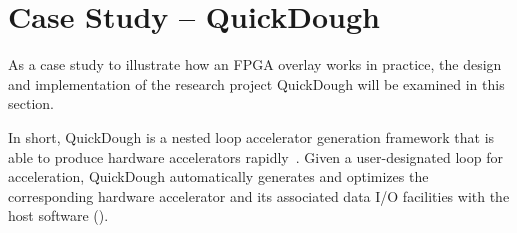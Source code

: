 \iffalse
\subsection{Other Related Works}
It is worth noting that the concept of FPGA overlay has been evolved out of many related earlier works in related areas.  Some of them are listed below.

To address the lengthy tool run time, researchers and tool vendors have been exploring the use of macro-based techniques for a while.  In the work of HMFlow \cite{lavin2010, lavin2011}, Lavin et al. explored the tradeoffs between implementation flexibility and compilation by incorporating hard macros into the design flow.  In the same work, they also 

On top of the various overlay architectures, there are techniques that are complementary to the FPGA
overlays. First of all, Macros based compilation techniques \cite{lavin2010, lavin2011} help to
improve both design portability and improve design productivity. 

Particularly, the authors in
\cite{ROB2015} proposed a rapid FPGA overlay builder by using techniques including module
relocation, module stitching and module variants. 

\fi

\section{Case Study -- QuickDough}
%
As a case study to illustrate how an FPGA overlay works in practice, the design and implementation of the research project QuickDough will be examined in this section.

%
In short, QuickDough is a nested loop accelerator generation framework that is able to produce hardware accelerators rapidly~\cite{Lin:2012:EDC:2460216.2460227,Liu:2015:FSP}.
Given a user-designated loop for acceleration, QuickDough automatically generates and optimizes the corresponding hardware accelerator and its associated data I/O facilities with the host software ().



